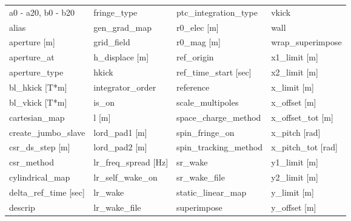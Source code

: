  \begin{tabular}{llll} \toprule
a0 - a20, b0 - b20               & fringe_type                      & ptc_integration_type             & vkick                            \\
alias                            & gen_grad_map                     & r0_elec [m]                      & wall                             \\
aperture [m]                     & grid_field                       & r0_mag [m]                       & wrap_superimpose                 \\
aperture_at                      & h_displace [m]                   & ref_origin                       & x1_limit [m]                     \\
aperture_type                    & hkick                            & ref_time_start [sec]             & x2_limit [m]                     \\
bl_hkick [T*m]                   & integrator_order                 & reference                        & x_limit [m]                      \\
bl_vkick [T*m]                   & is_on                            & scale_multipoles                 & x_offset [m]                     \\
cartesian_map                    & l [m]                            & space_charge_method              & x_offset_tot [m]                 \\
create_jumbo_slave               & lord_pad1 [m]                    & spin_fringe_on                   & x_pitch [rad]                    \\
csr_ds_step [m]                  & lord_pad2 [m]                    & spin_tracking_method             & x_pitch_tot [rad]                \\
csr_method                       & lr_freq_spread [Hz]              & sr_wake                          & y1_limit [m]                     \\
cylindrical_map                  & lr_self_wake_on                  & sr_wake_file                     & y2_limit [m]                     \\
delta_ref_time [sec]             & lr_wake                          & static_linear_map                & y_limit [m]                      \\
descrip                          & lr_wake_file                     & superimpose                      & y_offset [m]                     \\

\end{tabular}

